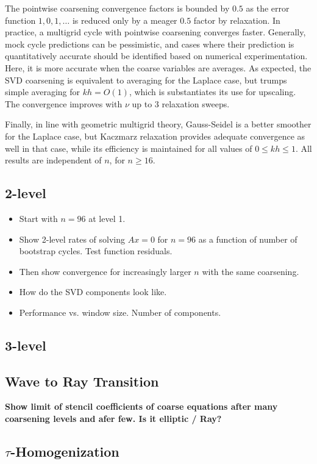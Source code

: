 \documentclass{article}
\begin{document}
The pointwise coarsening convergence factors is bounded by $0.5$ as the error function $1,0,1,\dots$ is reduced only by a meager $0.5$ factor by relaxation. In practice, a multigrid cycle with pointwise coarsening converges faster. Generally, mock cycle predictions can be pessimistic, and cases where their prediction is quantitatively accurate should be identified based on numerical experimentation. Here, it is more accurate when the coarse variables are averages. As expected, the SVD coarsening is equivalent to averaging for the Laplace case, but trumps simple averaging for $kh = O(1)$, which is substantiates its use for upscaling. The convergence improves with $\nu$ up to $3$ relaxation sweeps.

Finally, in line with geometric multigrid theory, Gauss-Seidel is a better smoother for the Laplace case, but Kaczmarz relaxation provides adequate convergence as well in that case, while its efficiency is maintained for all values of $0 \leq kh \leq 1$. All results are independent of $n$, for $n \geq 16$.

\subsection{2-level}
{\bf 
\begin{itemize}
\item Start with $n=96$ at level 1. 
\item Show 2-level rates of solving $A x = 0$ for $n=96$ as a function of number of bootstrap cycles. Test function residuals.
\item  Then show convergence for increasingly larger $n$ with the same coarsening.
\item How do the SVD components look like.
\item Performance vs. window size. Number of components.
\end{itemize}
}

\subsection{3-level}

\subsection{Wave to Ray Transition}
{\bf Show limit of stencil coefficients of coarse equations after many coarsening levels and afer few. Is it elliptic / Ray?}

\subsection{$\tau$-Homogenization}
\end{document}
